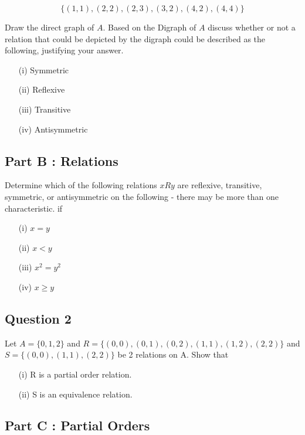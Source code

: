 \documentclass[]{report}
\begin{document}
\[ \{  (1,1),(2,2),(2,3),(3,2),(4,2),(4,4)\} \]

Draw the direct graph of $A$. Based on the Digraph of $A$ discuss whether or not a relation that could be depicted by the digraph could be described as the following, justifying your answer.


\begin{itemize}
\item[(i)] Symmetric
\item[(ii)] Reflexive 
\item[(iii)] Transitive
\item[(iv)] Antisymmetric
\end{itemize}
\subsection*{Part B : Relations}
Determine which of the following relations $ x R y$ are reflexive, transitive, symmetric, or antisymmetric on the following - there may be more than one characteristic.  if

\begin{itemize} 
\item[(i)] $x = y$
\item[(ii)] $x < y$
\item[(iii)] $x^2 = y^2$
\item[(iv)] $x \geq y$
\end{itemize}
\subsection*{Question 2}


Let $A=\{0,1,2\}$ and $R=\{ (0,0),(0,1),(0,2),(1,1), (1,2), (2,2)\}$
and $S=\{(0,0),(1,1),(2,2)\}$ be 2 relations on A. Show that

\begin{itemize}
\item[(i)] R is a partial order relation.
\item[(ii)] S is an equivalence relation.
\end{itemize}

\subsection*{Part C : Partial Orders}
\end{document}
